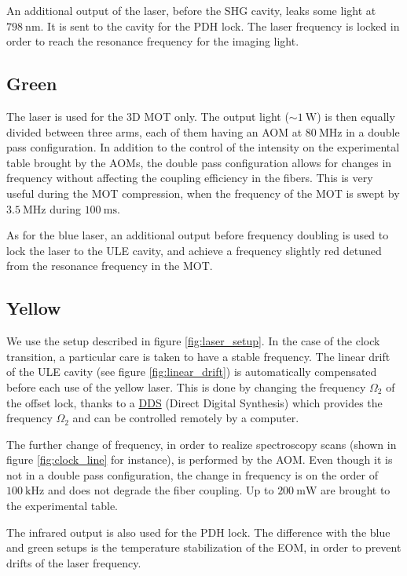 \documentclass[11pt]{article}
\numberwithin{equation}{section}
\numberwithin{figure}{section}
\begin{document}
An additional output of the laser, before the SHG cavity, leaks some light at $\SI{798}{\nano\metre}$. It is sent to the cavity for the PDH lock. The laser frequency is locked in order to reach the resonance frequency for the imaging light.

\subsection*{Green}
The laser is used for the 3D MOT only. The output light ($\sim \SI{1}{\watt}$) is then equally divided between three arms, each of them having an AOM at $\SI{80}{\mega\hertz}$ in a double pass configuration. In addition to the control of the intensity on the experimental table brought by the AOMs, the double pass configuration allows for changes in frequency without affecting the coupling efficiency in the fibers. This is very useful during the MOT compression, when the frequency of the MOT is swept by $\SI{3.5}{\mega\hertz}$ during $\SI{100}{\milli\second}$. 

As for the blue laser, an additional output before frequency doubling is used to lock the laser to the ULE cavity, and achieve a frequency slightly red detuned from the resonance frequency in the MOT.

\subsection*{Yellow} 
We use the setup described in figure \ref{fig:laser_setup}. In the case of the clock transition, a particular care is taken to have a stable frequency. The linear drift of the ULE cavity (see figure \ref{fig:linear_drift}) is automatically compensated before each use of the yellow laser. This is done by changing the frequency $\Omega_2$ of the offset lock, thanks to a \href{https://www.wieserlabs.com/products/radio-frequency-generators/WL-FlexDDS-NG}{DDS} (Direct Digital Synthesis) which provides the frequency $\Omega_2$ and can be controlled remotely by a computer.

The further change of frequency, in order to realize spectroscopy scans (shown in figure \ref{fig:clock_line} for instance), is performed by the AOM. Even though it is not in a double pass configuration, the change in frequency is on the order of $\SI{100}{\kilo\hertz}$ and does not degrade the fiber coupling. Up to $\SI{200}{\milli\watt}$ are brought to the experimental table.

The infrared output is also used for the PDH lock. The difference with the blue and green setups is the temperature stabilization of the EOM, in order to prevent drifts of the laser frequency.
\end{document}
